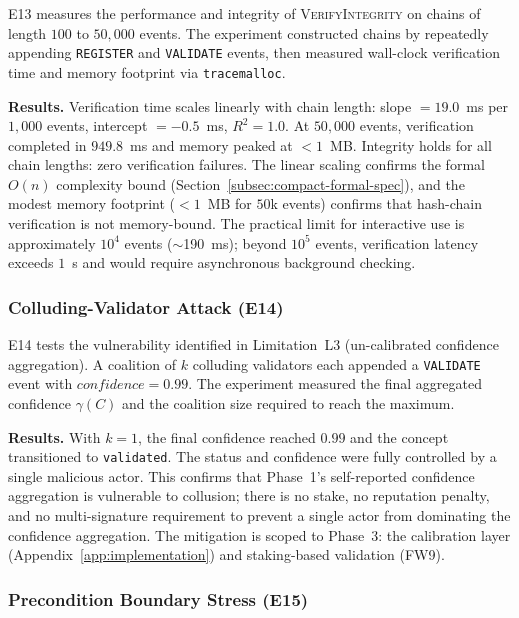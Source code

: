 E13 measures the performance and integrity of \textsc{VerifyIntegrity} on chains of length $100$ to $50{,}000$ events. The experiment constructed chains by repeatedly appending \texttt{REGISTER} and \texttt{VALIDATE} events, then measured wall-clock verification time and memory footprint via \texttt{tracemalloc}.

\textbf{Results.} Verification time scales linearly with chain length: slope $= 19.0$~ms per $1{,}000$ events, intercept $= -0.5$~ms, $R^2 = 1.0$. At $50{,}000$ events, verification completed in $949.8$~ms and memory peaked at $<1$~MB. Integrity holds for all chain lengths: zero verification failures. The linear scaling confirms the formal $O(n)$ complexity bound (Section~\ref{subsec:compact-formal-spec}), and the modest memory footprint ($<1$~MB for $50$k events) confirms that hash-chain verification is not memory-bound. The practical limit for interactive use is approximately $10^4$ events ($\sim$190~ms); beyond $10^5$ events, verification latency exceeds $1$~s and would require asynchronous background checking.

\subsubsection{Colluding-Validator Attack (E14)}

E14 tests the vulnerability identified in Limitation~L3 (un-calibrated confidence aggregation). A coalition of $k$ colluding validators each appended a \texttt{VALIDATE} event with $\mathit{confidence} = 0.99$. The experiment measured the final aggregated confidence $\gamma(C)$ and the coalition size required to reach the maximum.

\textbf{Results.} With $k = 1$, the final confidence reached $0.99$ and the concept transitioned to \texttt{validated}. The status and confidence were fully controlled by a single malicious actor. This confirms that Phase~1's self-reported confidence aggregation is vulnerable to collusion; there is no stake, no reputation penalty, and no multi-signature requirement to prevent a single actor from dominating the confidence aggregation. The mitigation is scoped to Phase~3: the calibration layer (Appendix~\ref{app:implementation}) and staking-based validation (FW9).

\subsubsection{Precondition Boundary Stress (E15)}


